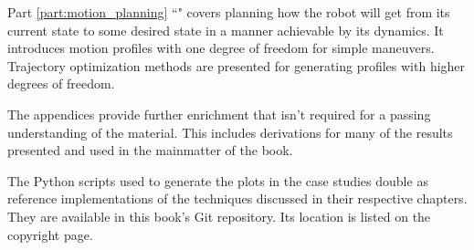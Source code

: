 Part \ref{part:motion_planning} ``" covers
planning how the robot will get from its current state to some desired state in
a manner achievable by its dynamics. It introduces motion profiles with one
degree of freedom for simple maneuvers. Trajectory optimization methods are
presented for generating profiles with higher degrees of freedom.

The appendices provide further enrichment that isn't required for a passing
understanding of the material. This includes derivations for many of the results
presented and used in the mainmatter of the book.

The Python scripts used to generate the plots in the case studies double as
reference implementations of the techniques discussed in their respective
chapters. They are available in this book's Git repository. Its location is
listed on the copyright page.
